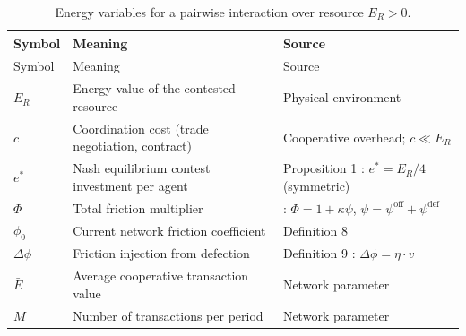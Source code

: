 \documentclass[11pt]{article}
\theoremstyle{plain}
\theoremstyle{definition}
\theoremstyle{remark}
\begin{document}
\begin{longtable}[]{@{}
  >{\raggedright\arraybackslash}p{}
  >{\raggedright\arraybackslash}p{}
  >{\raggedright\arraybackslash}p{}@{}}
\caption{Energy variables for a pairwise interaction over resource
\(E_R > 0\).}\tabularnewline
\toprule\noalign{}
\begin{minipage}[b]{\linewidth}\raggedright
Symbol
\end{minipage} & \begin{minipage}[b]{\linewidth}\raggedright
Meaning
\end{minipage} & \begin{minipage}[b]{\linewidth}\raggedright
Source
\end{minipage} \\
\midrule\noalign{}
\endfirsthead
\toprule\noalign{}
\begin{minipage}[b]{\linewidth}\raggedright
Symbol
\end{minipage} & \begin{minipage}[b]{\linewidth}\raggedright
Meaning
\end{minipage} & \begin{minipage}[b]{\linewidth}\raggedright
Source
\end{minipage} \\
\midrule\noalign{}
\endhead
\bottomrule\noalign{}
\endlastfoot
\(E_R\) & Energy value of the contested resource & Physical
environment \\
\(c\) & Coordination cost (trade negotiation, contract) & Cooperative
overhead; \(c \ll E_R\) \\
\(e^*\) & Nash equilibrium contest investment per agent & Proposition 1
\citep{TC-IV}: \(e^* = E_R/4\) (symmetric) \\
\(\Phi\) & Total friction multiplier & \citep{TC-IV}:
\(\Phi = 1 + \kappa\psi\),
\(\psi = \psi^{\text{off}} + \psi^{\text{def}}\) \\
\(\phi_0\) & Current network friction coefficient & Definition 8
\citep{TC-IV} \\
\(\Delta\phi\) & Friction injection from defection & Definition 9
\citep{TC-IV}: \(\Delta\phi = \eta \cdot v\) \\
\(\bar{E}\) & Average cooperative transaction value & Network
parameter \\
\(M\) & Number of transactions per period & Network parameter \\
\end{longtable}
\end{document}
